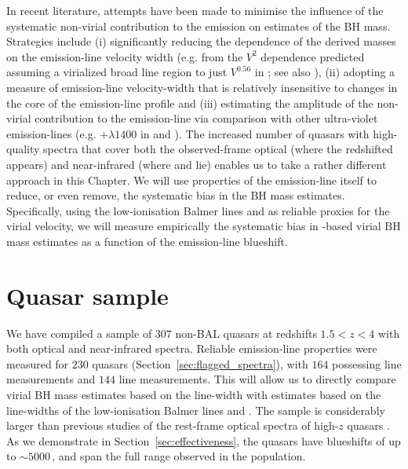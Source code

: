 In recent literature, attempts have been made to minimise the influence of the systematic non-virial contribution to the  emission on estimates of the BH mass. 
Strategies include (i) significantly reducing the dependence of the derived masses on the emission-line velocity width (e.g. from the $V^2$ dependence predicted assuming a virialized broad line region to just $V^{0.56}$ in \citealt{park13}; see also \citealt{shen12}), (ii) adopting a measure of emission-line velocity-width that is relatively insensitive to changes in the core of the emission-line profile \citep[e.g.][]{denney13} and (iii) estimating the amplitude of the non-virial contribution to the  emission-line via comparison with other ultra-violet emission-lines (e.g. +$\lambda$$1400$ in \citealt{runnoe13} and \citealt{brotherton15}).
The increased number of quasars with high-quality spectra that cover both the observed-frame optical (where the redshifted  appears) and near-infrared (where \hb and \ha lie) enables us to take a rather different approach in this Chapter.
We will use properties of the  emission-line itself to reduce, or even remove, the systematic bias in the BH mass estimates. 
Specifically, using the low-ionisation Balmer lines \ha and \hb as reliable proxies for the virial velocity, we will measure empirically the systematic bias in -based virial BH mass estimates as a function of the  emission-line blueshift.

\section{Quasar sample}

We have compiled a sample of $307$ non-BAL quasars at redshifts $1.5 < z < 4$ with both optical and near-infrared spectra.  
Reliable emission-line properties were measured for $230$ quasars (Section~\ref{sec:flagged_spectra}), with $164$ possessing \ha line measurements and $144$ \hb line measurements.  
This will allow us to directly compare virial BH mass estimates based on the  line-width with estimates based on the line-widths of the low-ionisation Balmer lines \ha and \hbns.  
The sample is considerably larger than previous studies of the rest-frame optical spectra of high-$z$ quasars \citep[e.g.][]{shen12}. 
As we demonstrate in Section~\ref{sec:effectiveness}, the quasars have  blueshifts of up to $\sim5000$\,\kms, and span the full range observed in the population. 

